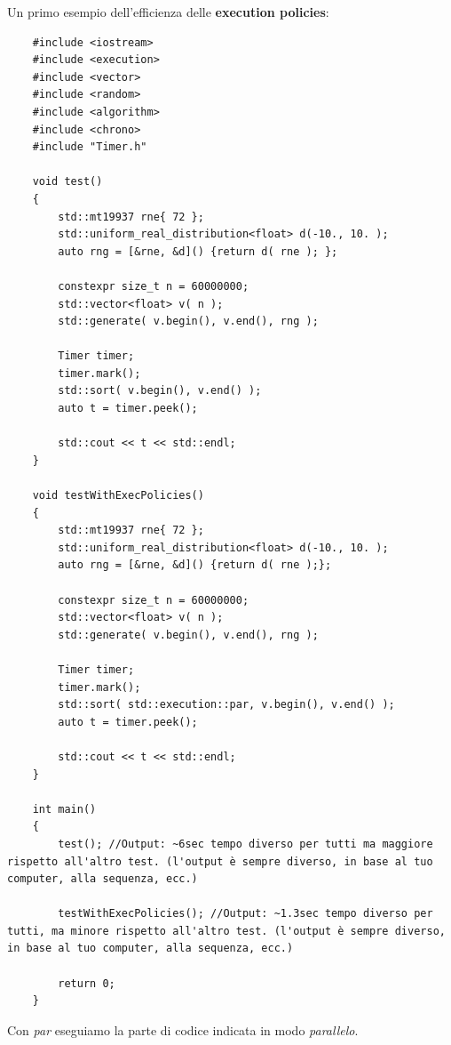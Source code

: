 \textsf{\small Un primo esempio dell'efficienza delle \textbf{execution policies}: } \\

\begin{lstlisting}
	#include <iostream>
	#include <execution>
	#include <vector>
	#include <random>
	#include <algorithm>
	#include <chrono>
	#include "Timer.h"

	void test()
	{
		std::mt19937 rne{ 72 };
		std::uniform_real_distribution<float> d(-10., 10. );
		auto rng = [&rne, &d]() {return d( rne ); };
		
		constexpr size_t n = 60000000;
		std::vector<float> v( n );
		std::generate( v.begin(), v.end(), rng ); 
		
		Timer timer;
		timer.mark();
		std::sort( v.begin(), v.end() );
		auto t = timer.peek();
		
		std::cout << t << std::endl;
	}
	
	void testWithExecPolicies()
	{
		std::mt19937 rne{ 72 };
		std::uniform_real_distribution<float> d(-10., 10. );
		auto rng = [&rne, &d]() {return d( rne );};
		
		constexpr size_t n = 60000000;
		std::vector<float> v( n );
		std::generate( v.begin(), v.end(), rng ); 
		
		Timer timer;
		timer.mark();
		std::sort( std::execution::par, v.begin(), v.end() );
		auto t = timer.peek();
		
		std::cout << t << std::endl;
	}
	
	int main()
	{
		test(); //Output: ~6sec tempo diverso per tutti ma maggiore rispetto all'altro test. (l'output è sempre diverso, in base al tuo computer, alla sequenza, ecc.)
		
		testWithExecPolicies(); //Output: ~1.3sec tempo diverso per tutti, ma minore rispetto all'altro test. (l'output è sempre diverso, in base al tuo computer, alla sequenza, ecc.)
		
		return 0;
	}
\end{lstlisting}


\textsf{\small Con \emph{par} eseguiamo la parte di codice indicata in modo \emph{parallelo}.} \\

